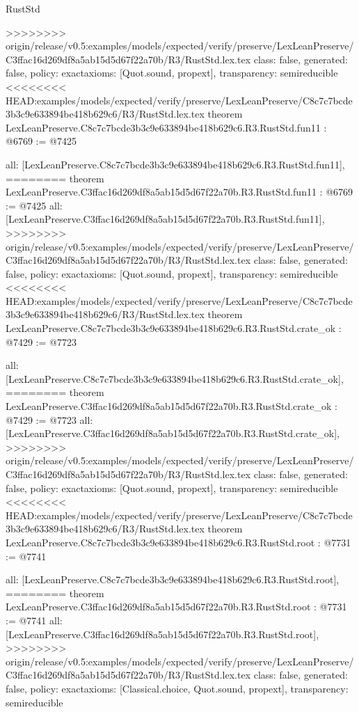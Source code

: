 \begin{lexlean}{RustStd}
\begin{coremodule}
{\begin{coremodule}
{{{{{{{{{{{{{{>>>>>>>> origin/release/v0.5:examples/models/expected/verify/preserve/LexLeanPreserve/C3ffac16d269df8a5ab15d5d67f22a70b/R3/RustStd.lex.tex
  class: false,
  generated: false,
  policy: exact{axioms: [Quot.sound, propext]},
  transparency: semireducible
}
<<<<<<<< HEAD:examples/models/expected/verify/preserve/LexLeanPreserve/C8c7c7bcde3b3c9e633894be418b629c6/R3/RustStd.lex.tex
theorem LexLeanPreserve.C8c7c7bcde3b3c9e633894be418b629c6.R3.RustStd.fun11 : @6769 := @7425 {
  all: [LexLeanPreserve.C8c7c7bcde3b3c9e633894be418b629c6.R3.RustStd.fun11],
========
theorem LexLeanPreserve.C3ffac16d269df8a5ab15d5d67f22a70b.R3.RustStd.fun11 : @6769 := @7425 {
  all: [LexLeanPreserve.C3ffac16d269df8a5ab15d5d67f22a70b.R3.RustStd.fun11],
>>>>>>>> origin/release/v0.5:examples/models/expected/verify/preserve/LexLeanPreserve/C3ffac16d269df8a5ab15d5d67f22a70b/R3/RustStd.lex.tex
  class: false,
  generated: false,
  policy: exact{axioms: [Quot.sound, propext]},
  transparency: semireducible
}
<<<<<<<< HEAD:examples/models/expected/verify/preserve/LexLeanPreserve/C8c7c7bcde3b3c9e633894be418b629c6/R3/RustStd.lex.tex
theorem LexLeanPreserve.C8c7c7bcde3b3c9e633894be418b629c6.R3.RustStd.crate_ok : @7429 := @7723 {
  all: [LexLeanPreserve.C8c7c7bcde3b3c9e633894be418b629c6.R3.RustStd.crate_ok],
========
theorem LexLeanPreserve.C3ffac16d269df8a5ab15d5d67f22a70b.R3.RustStd.crate_ok : @7429 := @7723 {
  all: [LexLeanPreserve.C3ffac16d269df8a5ab15d5d67f22a70b.R3.RustStd.crate_ok],
>>>>>>>> origin/release/v0.5:examples/models/expected/verify/preserve/LexLeanPreserve/C3ffac16d269df8a5ab15d5d67f22a70b/R3/RustStd.lex.tex
  class: false,
  generated: false,
  policy: exact{axioms: [Quot.sound, propext]},
  transparency: semireducible
}
<<<<<<<< HEAD:examples/models/expected/verify/preserve/LexLeanPreserve/C8c7c7bcde3b3c9e633894be418b629c6/R3/RustStd.lex.tex
theorem LexLeanPreserve.C8c7c7bcde3b3c9e633894be418b629c6.R3.RustStd.root : @7731 := @7741 {
  all: [LexLeanPreserve.C8c7c7bcde3b3c9e633894be418b629c6.R3.RustStd.root],
========
theorem LexLeanPreserve.C3ffac16d269df8a5ab15d5d67f22a70b.R3.RustStd.root : @7731 := @7741 {
  all: [LexLeanPreserve.C3ffac16d269df8a5ab15d5d67f22a70b.R3.RustStd.root],
>>>>>>>> origin/release/v0.5:examples/models/expected/verify/preserve/LexLeanPreserve/C3ffac16d269df8a5ab15d5d67f22a70b/R3/RustStd.lex.tex
  class: false,
  generated: false,
  policy: exact{axioms: [Classical.choice, Quot.sound, propext]},
  transparency: semireducible
}

}}}}}}}}}}}}}}}}
\end{coremodule}}
\end{coremodule}
\end{lexlean}
